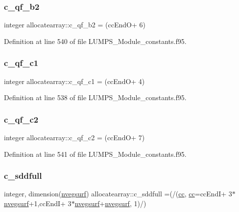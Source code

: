 \subsubsection{\texorpdfstring{c\+\_\+qf\+\_\+b2}{c\_qf\_b2}}
{\footnotesize\ttfamily integer allocatearray\+::c\+\_\+qf\+\_\+b2 = (cc\+EndO+ 6)}



Definition at line 540 of file L\+U\+M\+P\+S\+\_\+\+Module\+\_\+constants.\+f95.

\mbox{\label{namespaceallocatearray_a17cce5e7c3e285684d0237da33d9147d}} 
\subsubsection{\texorpdfstring{c\+\_\+qf\+\_\+c1}{c\_qf\_c1}}
{\footnotesize\ttfamily integer allocatearray\+::c\+\_\+qf\+\_\+c1 = (cc\+EndO+ 4)}



Definition at line 538 of file L\+U\+M\+P\+S\+\_\+\+Module\+\_\+constants.\+f95.

\mbox{\label{namespaceallocatearray_a8e5d39962fa81f4e9eeb4c4e8d80b5c7}} 
\subsubsection{\texorpdfstring{c\+\_\+qf\+\_\+c2}{c\_qf\_c2}}
{\footnotesize\ttfamily integer allocatearray\+::c\+\_\+qf\+\_\+c2 = (cc\+EndO+ 7)}



Definition at line 541 of file L\+U\+M\+P\+S\+\_\+\+Module\+\_\+constants.\+f95.

\mbox{\label{namespaceallocatearray_a207aa7370094486a8891ef23c877fa52}} 
\subsubsection{\texorpdfstring{c\+\_\+sddfull}{c\_sddfull}}
{\footnotesize\ttfamily integer, dimension(\hyperlink{namespaceallocatearray_abb987c3b35dd321963fd53d38f10236f}{nvegsurf}) allocatearray\+::c\+\_\+sddfull =(/(\hyperlink{namespaceallocatearray_ac863c81704eb507dee10f5e10741e10c}{cc}, \hyperlink{namespaceallocatearray_ac863c81704eb507dee10f5e10741e10c}{cc}=cc\+EndI+ 3$\ast$\hyperlink{namespaceallocatearray_abb987c3b35dd321963fd53d38f10236f}{nvegsurf}+1,cc\+EndI+ 3$\ast$\hyperlink{namespaceallocatearray_abb987c3b35dd321963fd53d38f10236f}{nvegsurf}+\hyperlink{namespaceallocatearray_abb987c3b35dd321963fd53d38f10236f}{nvegsurf}, 1)/)}



